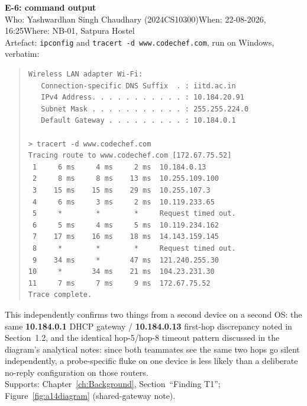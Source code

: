 \textbf{E-6: command output}\\
Who: Yashwardhan Singh Chaudhary (2024CS10300)\quad When: 22-08-2026, 16:25\quad Where: NB-01, Satpura Hostel\\
Artefact: \texttt{ipconfig} and \texttt{tracert -d www.codechef.com}, run on Windows, verbatim:
\begin{quote}\ttfamily\footnotesize
\begin{verbatim}
Wireless LAN adapter Wi-Fi:
   Connection-specific DNS Suffix  . : iitd.ac.in
   IPv4 Address. . . . . . . . . . . : 10.184.20.91
   Subnet Mask . . . . . . . . . . . : 255.255.224.0
   Default Gateway . . . . . . . . . : 10.184.0.1

> tracert -d www.codechef.com
Tracing route to www.codechef.com [172.67.75.52]
 1     6 ms     4 ms     2 ms  10.184.0.13
 2     8 ms     8 ms    13 ms  10.255.109.100
 3    15 ms    15 ms    29 ms  10.255.107.3
 4     6 ms     3 ms     2 ms  10.119.233.65
 5     *        *        *     Request timed out.
 6     5 ms     4 ms     5 ms  10.119.234.162
 7    17 ms    16 ms    18 ms  14.143.159.145
 8     *        *        *     Request timed out.
 9    34 ms     *       47 ms  121.240.255.30
10     *       34 ms    21 ms  104.23.231.30
11     7 ms     7 ms     9 ms  172.67.75.52
Trace complete.
\end{verbatim}
\end{quote}
This independently confirms two things from a second device on a second OS: the same
\textbf{10.184.0.1} DHCP gateway / \textbf{10.184.0.13} first-hop discrepancy noted in
Section~1.2, and the identical hop-5/hop-8 timeout pattern discussed in the diagram's analytical
notes: since both teammates see the same two hops go silent independently, a probe-specific
fluke on one device is less likely than a deliberate no-reply configuration on those routers.\\
Supports: Chapter~\ref{ch:Background}, Section~``Finding T1''; Figure~\ref{fig:a14diagram} (shared-gateway note).

